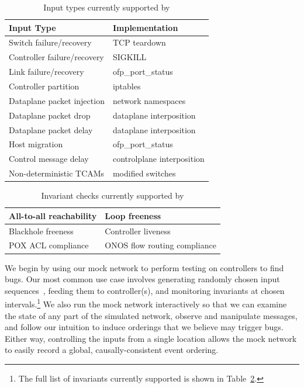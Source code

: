 \begin{table}
\centering
\begin{tabular}{|l|l|}
\hline
Input Type &  Implementation \\
\hline
\hline
Switch failure/recovery & TCP teardown \\
\hline
Controller failure/recovery & SIGKILL \\
\hline
Link failure/recovery & ofp\_port\_status \\
\hline
Controller partition & iptables \\
\hline
Dataplane packet injection & network namespaces \\
\hline
Dataplane packet drop & dataplane interposition \\
\hline
Dataplane packet delay & dataplane interposition \\
\hline
Host migration & ofp\_port\_status \\
\hline
Control message delay & controlplane interposition \\
\hline
Non-deterministic TCAMs & modified switches \\
\hline
\end{tabular}
\caption{Input types currently supported by \projectname}
\label{tab:inputs}
\end{table}

\begin{table}
\centering
\begin{tabular}{|l|l|}
\hline
All-to-all reachability & Loop freeness \\
\hline
Blackhole freeness & Controller liveness \\
\hline
POX ACL compliance & ONOS flow routing compliance \\
\hline
\end{tabular}
\caption{Invariant checks currently supported by \projectname}
\label{tab:invariants}
\end{table}

We begin by using our mock network to perform testing on controllers to find
bugs. Our most common use case involves generating randomly chosen input
sequences~\cite{Miller:1990:ESR:96267.96279}, feeding them to controller(s),
and monitoring
invariants at chosen intervals.\footnote{The full list of invariants currently
supported is shown in Table~\ref{tab:invariants}.}
We also run the mock network interactively
so that we can examine the state of any part of the simulated network,
observe and manipulate messages, and follow our
intuition to induce orderings that we believe may trigger bugs.
Either way, controlling the inputs from a single location
allows the mock network to easily record a global, causally-consistent
event ordering.

